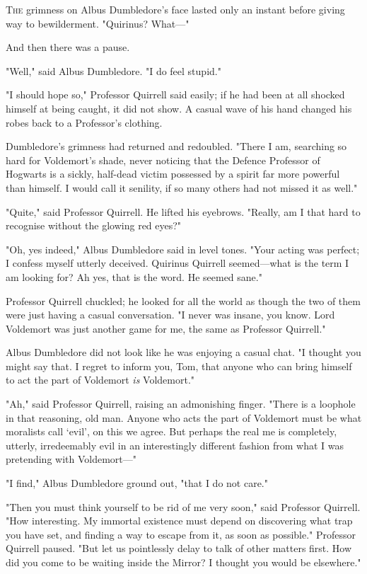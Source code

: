 
\lettrine{T}{he} grimness on Albus Dumbledore's face lasted only an instant before giving
way to bewilderment. "Quirinus? What---"

And then there was a pause.

"Well," said Albus Dumbledore. "I do feel stupid."

"I should hope so," Professor Quirrell said easily; if he had been at all
shocked himself at being caught, it did not show. A casual wave of his hand
changed his robes back to a Professor's clothing.

Dumbledore's grimness had returned and redoubled. "There I am, searching so
hard for Voldemort's shade, never noticing that the Defence Professor of
Hogwarts is a sickly, half-dead victim possessed by a spirit far more powerful
than himself. I would call it senility, if so many others had not missed it as
well."

"Quite," said Professor Quirrell. He lifted his eyebrows. "Really, am I that
hard to recognise without the glowing red eyes?"

"Oh, yes indeed," Albus Dumbledore said in level tones. "Your acting was
perfect; I confess myself utterly deceived. Quirinus Quirrell seemed---what is
the term I am looking for? Ah yes, that is the word. He seemed sane."

Professor Quirrell chuckled; he looked for all the world as though the two of
them were just having a casual conversation. "I never was insane, you know.
Lord Voldemort was just another game for me, the same as Professor Quirrell."

Albus Dumbledore did not look like he was enjoying a casual chat. "I thought
you might say that. I regret to inform you, Tom, that anyone who can bring
himself to act the part of Voldemort \emph{is} Voldemort."

"Ah," said Professor Quirrell, raising an admonishing finger. "There is a
loophole in that reasoning, old man. Anyone who acts the part of Voldemort must
be what moralists call `evil', on this we agree. But perhaps the real me is
completely, utterly, irredeemably evil in an interestingly different fashion
from what I was pretending with Voldemort---"

"I find," Albus Dumbledore ground out, "that I do not care."

"Then you must think yourself to be rid of me very soon," said Professor
Quirrell. "How interesting. My immortal existence must depend on discovering
what trap you have set, and finding a way to escape from it, as soon as
possible." Professor Quirrell paused. "But let us pointlessly delay to talk of
other matters first. How did you come to be waiting inside the Mirror? I
thought you would be elsewhere."

